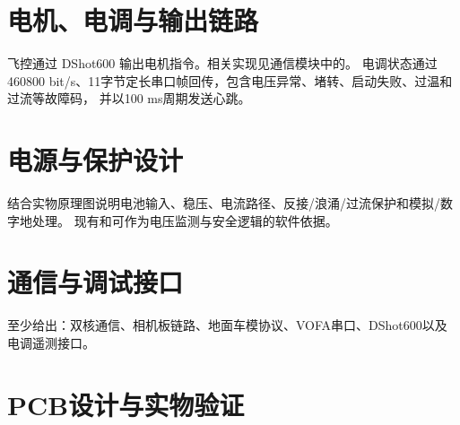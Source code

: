 \section{电机、电调与输出链路}

飞控通过 DShot600 输出电机指令。相关实现见通信模块中的。
电调状态通过 460800 bit/s、11字节定长串口帧回传，包含电压异常、堵转、启动失败、过温和过流等故障码，
并以100 ms周期发送心跳。


\section{电源与保护设计}

结合实物原理图说明电池输入、稳压、电流路径、反接/浪涌/过流保护和模拟/数字地处理。
现有和可作为电压监测与安全逻辑的软件依据。

\section{通信与调试接口}

至少给出：双核通信、相机板链路、地面车模协议、VOFA串口、DShot600以及电调遥测接口。

\section{PCB设计与实物验证}


